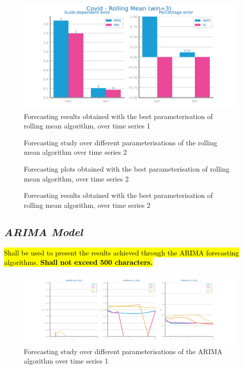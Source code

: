 \documentclass[10pt]{extarticle}
\newcommand{\ctext}[3][RGB]{%
  \begingroup
  \definecolor{hlcolor}{#1}{#2}\sethlcolor{hlcolor}%
  \hl{#3}%
  \endgroup
}
\begin{document}
\begin{figure}[H]
\centering\includegraphics[scale=0.5]{images/dataset1/time_series/Covid - Rolling Mean (win=3)_forecasting_eval.png}
\caption{Forecasting results obtained with the best parameterisation of rolling mean algorithm, over time series 1}
\end{figure}

\begin{figure}[H]
\caption{Forecasting study over different parameterisations of the rolling mean algorithm over time series 2}
\end{figure}

\begin{figure}[H]
\caption{Forecasting plots obtained with the best parameterisation of rolling mean algorithm, over time series 2}
\end{figure}

\begin{figure}[H]
\caption{Forecasting results obtained with the best parameterisation of rolling mean algorithm, over time series 2}
\end{figure}

\subsection*{\textit{ARIMA Model}}
\ctext[RGB]{190,190,190}{Shall be used to present the results achieved through the ARIMA forecasting algorithms.  \textbf{Shall not exceed 500 characters.}}

\begin{figure}[H]
\centering\includegraphics[scale=0.4]{images/dataset1/time_series/Covid_arima_R2_study.png}
\caption{Forecasting study over different parameterisations of the ARIMA algorithm over time series 1}
\end{figure}
\end{document}

